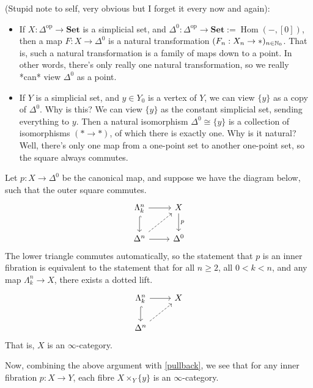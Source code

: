 \documentclass{MetricNotes2023}
\def\nat{\ensuremath\mathbb{N}}
\DeclareMathOperator{\Hom}{Hom}
\begin{document}

(Stupid note to self, very obvious but I forget it every now and again):
\begin{itemize}
\item If \(X : \Delta^{\text{op}}\to \textbf{Set}\) is a simplicial set, and \(\Delta^0 : \Delta^{\text{op}}\to \textbf{Set}:= \Hom(-, [0])\), then a map \(F : X \to \Delta^0\) is a natural transformation \((F_n : X_n \to *)_{n \in \nat_0}\). That is, such a natural transformation is a family of maps down to a point. In other words, there's only really one natural transformation, so we really *can* view \(\Delta^0\) as a point. 
\item If \(Y\) is a simplicial set, and \(y \in Y_0\) is a vertex of \(Y\), we can view \(\{y\}\) as a copy of \(\Delta^0\). Why is this? We can view \(\{y\}\) as the constant simplicial set, sending everything to \(y\). Then a natural isomorphism \(\Delta^0 \cong \{y\}\) is a collection of isomorphisms \((* \to *)\), of which there is exactly one. Why is it natural? Well, there's only one map from a one-point set to another one-point set, so the square always commutes. 
\end{itemize}

\begin{example}
Let \(p : X \to \Delta^0\) be the canonical map, and suppose we have the diagram below, such that the outer square commutes. 
\[\begin{tikzcd}
\Lambda^n_k \arrow[r, ""] \arrow[d, hookrightarrow, swap, ""]  & X \arrow[d, "p"]  \\
\Delta^n \arrow[r, swap, ""] \arrow[ur, dashrightarrow, swap, ""]  & \Delta^0
\end{tikzcd}\]
The lower triangle commutes automatically, so the statement that \(p\) is an inner fibration is equivalent to the statement that for all \(n \geq 2\), all \(0 < k < n\), and any map \(\Lambda^n_k \to X\), there exists a dotted lift.
\[\begin{tikzcd}
\Lambda^n_k \arrow[r, ""] \arrow[d, hookrightarrow, swap, ""]  & X  \\
\Delta^n \arrow[ur, dashrightarrow, swap, ""]  & 
\end{tikzcd}\]
That is, \(X\) is an \(\infty\)-category.

Now, combining the above argument with \ref{pullback}, we see that for any inner fibration \(p : X \to Y\), each fibre \(X\times_Y \{y\}\) is an \(\infty\)-category. 
\end{example}
\end{document}
